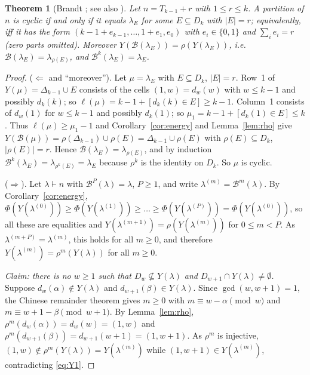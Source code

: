 \documentclass[11pt]{article}
\newtheorem{theorem}{Theorem}[section]
\theoremstyle{definition}
\newcommand{\B}{\mathcal{B}}
\renewcommand{\le}{\leqslant}
\renewcommand{\ge}{\geqslant}
\begin{document}
\begin{theorem}[Brandt \cite{Br}; see also \cite{AD,Et,GH}]\label{thm:brandt}
Let $n=T_{k-1}+r$ with $1\le r\le k$.  A partition of $n$ is cyclic if and only if it equals $\lambda_E$
for some $E\subseteq D_k$ with $|E|=r$; equivalently, iff it has the form
$(k-1+e_{k-1},\dots,1+e_1,e_0)$ with $e_i\in\{0,1\}$ and $\sum_ie_i=r$ (zero parts omitted).
Moreover $Y(\B(\lambda_E))=\rho(Y(\lambda_E))$, i.e.\ $\B(\lambda_E)=\lambda_{\rho(E)}$, and $\B^k(\lambda_E)=\lambda_E$.
\end{theorem}
\begin{proof}
($\Leftarrow$ and ``moreover'').  Let $\mu=\lambda_E$ with $E\subseteq D_k$, $|E|=r$.  Row~1 of
$Y(\mu)=\Delta_{k-1}\cup E$ consists of the cells $(1,w)=d_w(w)$ with $w\le k-1$ and possibly $d_k(k)$;
so $\ell(\mu)=k-1+[d_k(k)\in E]\ge k-1$.  Column~1 consists of $d_w(1)$ for $w\le k-1$ and possibly $d_k(1)$;
so $\mu_1=k-1+[d_k(1)\in E]\le k$.  Thus $\ell(\mu)\ge\mu_1-1$ and Corollary~\ref{cor:energy} and
Lemma~\ref{lem:rho} give $Y(\B(\mu))=\rho(\Delta_{k-1})\cup\rho(E)=\Delta_{k-1}\cup\rho(E)$ with
$\rho(E)\subseteq D_k$, $|\rho(E)|=r$.  Hence $\B(\lambda_E)=\lambda_{\rho(E)}$, and by induction
$\B^k(\lambda_E)=\lambda_{\rho^k(E)}=\lambda_E$ because $\rho^k$ is the identity on $D_k$.  So $\mu$ is cyclic.

($\Rightarrow$).  Let $\lambda\vdash n$ with $\B^P(\lambda)=\lambda$, $P\ge 1$, and write
$\lambda^{(m)}=\B^m(\lambda)$.  By Corollary~\ref{cor:energy},
$\Phi(Y(\lambda^{(0)}))\ge\Phi(Y(\lambda^{(1)}))\ge\dots\ge\Phi(Y(\lambda^{(P)}))=\Phi(Y(\lambda^{(0)}))$, so all these are
equalities and $Y(\lambda^{(m+1)})=\rho(Y(\lambda^{(m)}))$ for $0\le m<P$.  As $\lambda^{(m+P)}=\lambda^{(m)}$, this holds for
all $m\ge0$, and therefore $Y(\lambda^{(m)})=\rho^m(Y(\lambda))$ for all $m\ge 0$.

\emph{Claim: there is no $w\ge1$ such that $D_w\not\subseteq Y(\lambda)$ and $D_{w+1}\cap Y(\lambda)\ne\emptyset$.}
Suppose $d_w(\alpha)\notin Y(\lambda)$ and $d_{w+1}(\beta)\in Y(\lambda)$.  Since $\gcd(w,w+1)=1$, the Chinese remainder
theorem gives $m\ge0$ with $m\equiv w-\alpha\pmod w$ and $m\equiv w+1-\beta\pmod{w+1}$.  By Lemma~\ref{lem:rho},
$\rho^m(d_w(\alpha))=d_w(w)=(1,w)$ and $\rho^m(d_{w+1}(\beta))=d_{w+1}(w+1)=(1,w+1)$.  As $\rho^m$ is injective,
$(1,w)\notin\rho^m(Y(\lambda))=Y(\lambda^{(m)})$ while $(1,w+1)\in Y(\lambda^{(m)})$, contradicting \eqref{eq:Y1}.


\end{proof}
\end{document}
